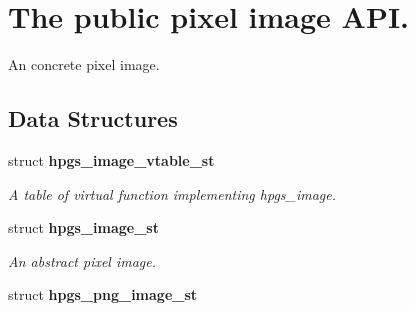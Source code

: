 \section{The public pixel image API.}
\label{group__image}


An concrete pixel image.  


\subsection*{Data Structures}
\begin{DoxyCompactItemize}
\item 
struct {\bf hpgs\_\-image\_\-vtable\_\-st}
\begin{DoxyCompactList}\small\item\em A table of virtual function implementing {\ttfamily hpgs\_\-image}. \item\end{DoxyCompactList}\item 
struct {\bf hpgs\_\-image\_\-st}
\begin{DoxyCompactList}\small\item\em An abstract pixel image. \item\end{DoxyCompactList}\item 
struct {\bf hpgs\_\-png\_\-image\_\-st}
\end{DoxyCompactItemize}
